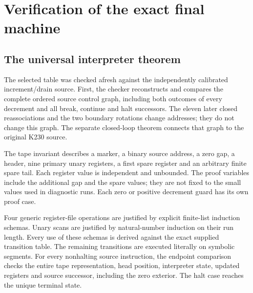 \section{Verification of the exact final machine}
\label{sec:verification}

\subsection{The universal interpreter theorem}

The selected table was checked afresh against the independently calibrated
increment/drain source. First, the checker reconstructs and compares the
complete ordered source control graph, including both outcomes of every
decrement and all break, continue and halt successors. The eleven later
closed reassociations and the two boundary rotations change addresses;
they do not change this graph. The separate closed-loop theorem connects
that graph to the original K230 source.

The tape invariant describes a marker, a binary source address, a zero
gap, a header, nine primary unary registers, a first spare register and
an arbitrary finite spare tail. Each register value is independent and
unbounded. The proof variables include the additional gap and the spare
values; they are not fixed to the small values used in diagnostic runs.
Each zero or positive decrement guard has its own proof case.

Four generic register-file operations are justified by explicit
finite-list induction schemas. Unary scans are justified by natural-number
induction on their run length. Every use of these schemas is derived
against the exact supplied transition table. The remaining transitions
are executed literally on symbolic segments. For every nonhalting source instruction, the endpoint comparison checks
the entire tape representation, head position, interpreter state, updated
registers and source successor, including the zero exterior. The halt
case reaches the unique terminal state.

